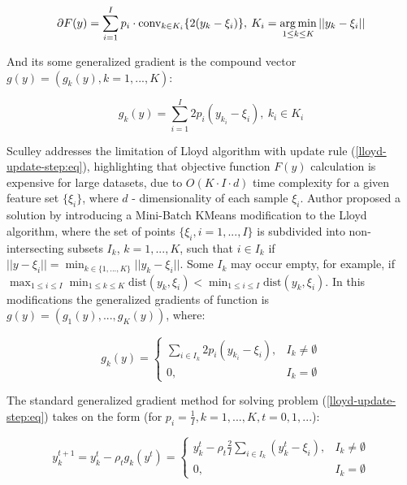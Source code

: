 \begin{equation}
    \label{lloyd-grad-set:eq}
        \partial F(y) = \sum_{i=1}^I p_i \cdot \text{conv}_{k \in K_i} \{ 2 (y_k - \xi_i) \}, \> K_i = \operatorname*{arg\,min}_{1 \leq k \leq K} || y_k - \xi_i ||
\end{equation}

And its some generalized gradient is the compound vector $ g(y) = (g_k(y), k = 1, ..., K) $:

\begin{equation}
    \label{lloyd-compound-grad:eq}
        g_k(y) = \sum_{i=1}^I 2 p_i (y_{k_i} - \xi_i), \> k_i \in K_i
\end{equation}

Sculley \cite{Sculley_2010} addresses the limitation of Lloyd algorithm with update rule (\ref{lloyd-update-step:eq}), highlighting that objective function $ F(y) $ calculation is expensive for large datasets, due to $ O(K \cdot I \cdot d) $ time complexity for a given feature set $ \{ \xi_i \} $, where $ d $ - dimensionality of each sample $ \xi_i $. Author proposed a solution by introducing a Mini-Batch KMeans modification to the Lloyd algorithm, where the set of points $ \{ \xi_i, i = 1, ..., I \} $ is subdivided into non-intersecting subsets $ I_k $, $ k = 1, ..., K $,  such that $ i \in I_k $ if $ || y - \xi_i || = \min_{k \in \{ 1, ..., K \}} || y_k - \xi_i || $.  Some $ I_k $ may occur empty, for example, if $ \max_{1 \leq i \leq I} \min_{1 \leq k \leq K} \text{dist} (y_k, \xi_i) < \min_{1 \leq i \leq I} \text{dist} (y_k, \xi_i) $. In this modifications the generalized gradients of function is $ g(y) = (g_1(y), ..., g_K(y)) $, where:

\begin{equation}
    \label{lloyd-gen-grad-component:eq}
    g_k(y) = \begin{cases}
        \sum_{i \in I_k} 2 p_i (y_{k_i} - \xi_i), & I_k \neq \emptyset \\
        0, & I_k = \emptyset 
    \end{cases}
\end{equation}

The standard generalized gradient method for solving problem (\ref{lloyd-update-step:eq}) takes on the form (for $ p_i = \frac{1}{I}, k = 1, ..., K, t = 0, 1, ... $):

\begin{equation}
    \label{lloyd-gen-grad:eq}
    y_k^{t+1} = y_k^t - \rho_t g_k(y^t) = \begin{cases}
        y_k^t - \rho_t \frac{2}{I} \sum_{i \in I_k} (y_k^t - \xi_i), & I_k \neq \emptyset \\
        0, & I_k = \emptyset
    \end{cases}
\end{equation}

